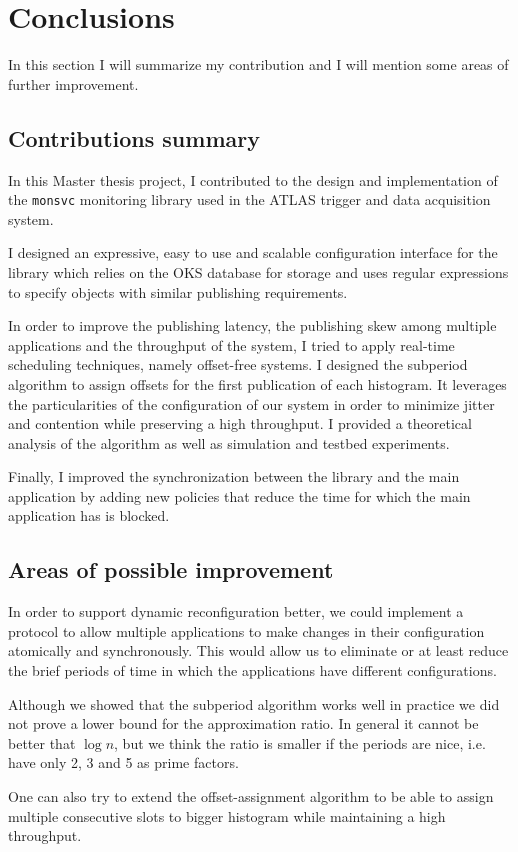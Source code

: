 \chapter{Conclusions} %
\label{Capitolul6}


In this section I will summarize my contribution and I will mention some areas of further improvement.

\section{Contributions summary}

In this Master thesis project, I contributed to the design and implementation of the {\tt monsvc} monitoring library used in the ATLAS trigger and data acquisition system.

I designed an expressive, easy to use and scalable configuration interface for the library which relies on the OKS \citep{jones1998oks} database for storage and uses regular expressions to specify objects with similar publishing requirements.

In order to improve the publishing latency, the publishing skew among multiple applications and the throughput of the system, I tried to apply real-time scheduling techniques, namely offset-free systems. I designed the subperiod algorithm to assign offsets for the first publication of each histogram. It leverages the particularities of the configuration of our system in order to minimize jitter and contention while preserving a high throughput. I provided a theoretical analysis of the algorithm as well as simulation and testbed experiments.

Finally, I improved the synchronization between the library and the main application by adding new policies that reduce the time for which the main application has is blocked.


\section{Areas of possible improvement}

In order to support dynamic reconfiguration better, we could implement a protocol to allow multiple applications to make changes in their configuration atomically and synchronously. This would allow us to eliminate or at least reduce the brief periods of time in which the applications have different configurations.

Although we showed that the subperiod algorithm works well in practice we did not prove a lower bound for the approximation ratio. In general it cannot be better that $\log n$, but we think the ratio is smaller if the periods are nice, i.e. have only 2, 3 and 5 as prime factors.

One can also try to extend the offset-assignment algorithm to be able to assign multiple consecutive slots to bigger histogram while maintaining a high throughput. 
